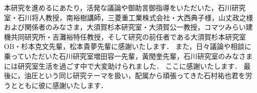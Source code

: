 本研究を進めるにあたり，活発な議論や御助言御指導をいただいた，石川研究室・石川将人教授，南裕樹講師，三菱重工業株式会社・大西典子様，山丈政之様および関係者のみなさま，大須賀杉本研究室・大須賀公一教授，コマツみらい建機共同研究所・吉灘裕特任教授，そして研究の前任者である大須賀杉本研究室OB・杉本克文先輩，松本貴夢先輩に感謝いたします．
また，日々議論や相談に乗っていただいた石川研究室増田容一先輩，黃閏奎先輩，石川研究室のみなさまには研究室生活を過ごす中で大変助けられました．
ここに感謝いたします．
最後に，油圧という同じ研究テーマを扱い，配属から頑張ってきた石村祐也君を労うとともに彼に感謝いたします．
